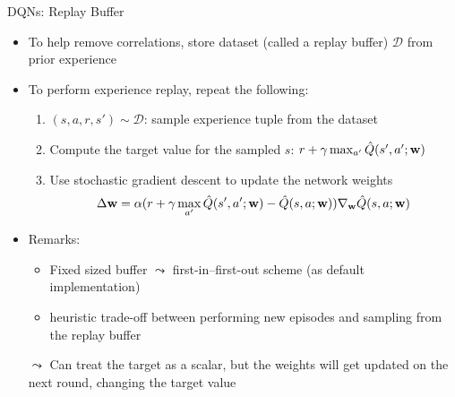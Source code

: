 \documentclass[aspectratio=169]{../latex_main/tntbeamer}  %
\begin{document}
\begin{frame}[c]{DQNs: Replay Buffer}
	
	\begin{itemize}
		\item To help remove correlations, store dataset (called a \alert{replay buffer}) $\mathcal{D}$ from prior experience
		\item To perform experience replay, repeat the following:
		\begin{enumerate}
			\item $(s,a,r,s')\sim \mathcal{D}$: sample experience tuple from the dataset
			\item Compute the target value for the sampled $s$: $r+\gamma \max_{a'} \hat{Q}(s',a';\mathbf{w})$
			\item Use stochastic gradient descent to update the network weights
			$$\Delta \mathbf{w} = \alpha (r + \gamma \max_{a'} \hat{Q}(s',a';\mathbf{w}) - \hat{Q}(s,a;\mathbf{w})) \nabla_{\mathbf{w}}\hat{Q}(s,a;\mathbf{w})$$
		\end{enumerate}
		\pause
		\item Remarks:
		\begin{itemize}
			\item Fixed sized buffer $\leadsto$ first-in--first-out scheme (as default implementation)
			\item heuristic trade-off between performing new episodes and sampling from the replay buffer
		\end{itemize}
			
		\medskip
		\pause
		\item[$\leadsto$] Can treat the target as a scalar, but the weights will get
		updated on the next round, changing the target value
	\end{itemize}
	
\end{frame}
\end{document}
